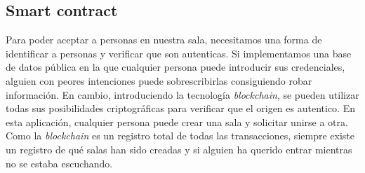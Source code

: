 \subsection{Smart contract}
Para poder aceptar a personas en nuestra sala, necesitamos una forma de identificar a personas y verificar que son autenticas. Si implementamos una base de datos pública en la que cualquier persona puede introducir sus credenciales, alguien con peores intenciones puede sobrescribirlas consiguiendo robar información.
En cambio, introduciendo la tecnología \textit{blockchain}, se pueden utilizar todas sus posibilidades criptográficas para verificar que el origen es autentico. En esta aplicación, cualquier persona puede crear una sala y solicitar unirse a otra. Como la \textit{blockchain} es un registro total de todas las transacciones, siempre existe un registro de qué salas han sido creadas y si alguien ha querido entrar mientras no se estaba escuchando.
